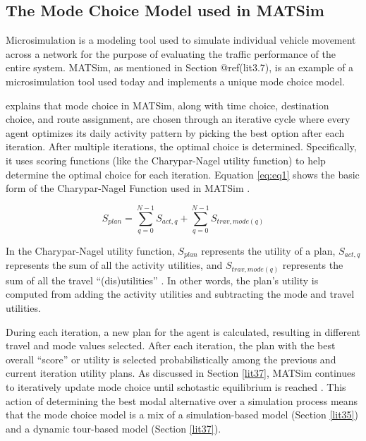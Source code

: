 \documentclass[3p, authoryear, review]{elsarticle} %
\begin{document}
\hypertarget{lit6}{%
\subsection{The Mode Choice Model used in MATSim}\label{lit6}}

Microsimulation is a modeling tool used to simulate individual vehicle movement across a network for the purpose of evaluating the traffic performance of the entire system. MATSim, as mentioned in Section @ref(lit3.7), is an example of a microsimulation tool used today and implements a unique mode choice model.

\citet{horni16} explains that mode choice in MATSim, along with time choice, destination choice, and route assignment, are chosen through an iterative cycle where every agent optimizes its daily activity pattern by picking the best option after each iteration. After multiple iterations, the optimal choice is determined. Specifically, it uses scoring functions (like the Charypar-Nagel utility function) to help determine the optimal choice for each iteration. Equation \eqref{eq:eq1} shows the basic form of the Charypar-Nagel Function used in MATSim \citep{horni16}.

\begin{equation} 
  S_{plan} = \sum_{q=0}^{N-1} S_{act,q} + \sum_{q=0}^{N-1} S_{trav,mode(q)}
  \label{eq:eq1}
\end{equation}

In the Charypar-Nagel utility function, \(S_{plan}\) represents the utility of a plan, \(S_{act,q}\) represents the sum of all the activity utilities, and \(S_{trav,mode(q)}\) represents the sum of all the travel ``(dis)utilities'' \citep{horni16}. In other words, the plan's utility is computed from adding the activity utilities and subtracting the mode and travel utilities.

During each iteration, a new plan for the agent is calculated, resulting in different travel and mode values selected. After each iteration, the plan with the best overall ``score'' or utility is selected probabilistically among the previous and current iteration utility plans. As discussed in Section \ref{lit37}, MATSim continues to iteratively update mode choice until schotastic equilibrium is reached \citep{hasnine21}. This action of determining the best modal alternative over a simulation process means that the mode choice model is a mix of a simulation-based model (Section \ref{lit35}) and a dynamic tour-based model (Section \ref{lit37}).
\end{document}
